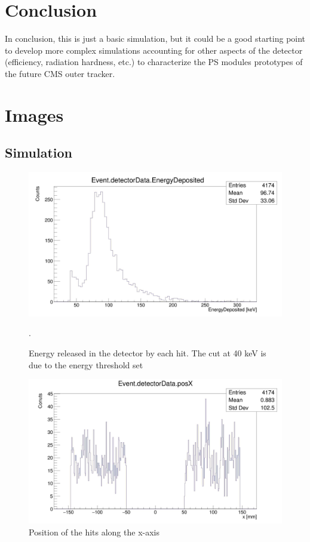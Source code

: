 \documentclass[10pt, a4paper, twocolumn]{article} %
\begin{document}
\section{Conclusion}
In conclusion, this is just a basic simulation, but it could be a good starting point to develop more complex simulations accounting for other aspects of the detector (efficiency, radiation hardness, etc.) to characterize the PS modules prototypes of the future CMS outer tracker.

\printbibliography[title={Bibliography}] %

\onecolumn

\section*{Images}
\subsection*{Simulation}

\begin{figure}[h!]
    \centering
    \includegraphics[width=0.8 \textwidth]{img/energy.jpg}
    \caption{Energy released in the detector by each hit. The cut at 40 keV is due to the energy threshold set}.
    \label{fig:energy}
\end{figure}
    
\begin{figure}[h!]
    \centering
    \includegraphics[width=0.8 \textwidth]{img/posx.jpg}
    \caption{Position of the hits along the x-axis}
    \label{fig:posX}
\end{figure}
\newpage
\end{document}
